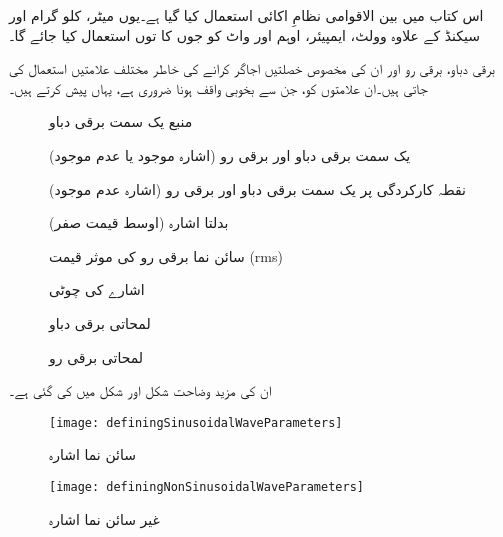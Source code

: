 
اس کتاب میں بین الاقوامی نظامِ اکائی  استعمال کیا گیا ہے۔یوں میٹر، کلو گرام اور سیکنڈ کے علاوہ وولٹ، ایمپیئر، اوہم اور واٹ کو جوں کا توں استعمال کیا جائے گا۔

برقی دباو، برقی رو اور ان کی مخصوص خصلتیں اجاگر کرانے کی خاطر مختلف علامتیں استعمال کی جاتی ہیں۔ان علامتوں کو، جن سے بخوبی واقف ہونا ضروری ہے، یہاں پیش کرتے ہیں۔

\begin{description}
\item
[]  منبع یک سمت برقی دباو
\item
[] یک سمت برقی دباو اور برقی رو  (اشارہ موجود یا عدم موجود)
\item
[]  نقطہ کارکردگی پر یک سمت برقی دباو اور برقی رو (اشارہ عدم موجود)
\item
[] بدلتا اشارہ (اوسط قیمت صفر)
\item
[ ]  سائن نما برقی رو کی موثر قیمت (rms)
\item
[ ]  اشارے کی چوٹی
\item
[ ] لمحاتی برقی دباو
\item
[ ] لمحاتی برقی رو
\end{description}

\FloatBarrier

ان کی مزید وضاحت شکل   اور شکل  میں کی گئی ہے۔

\begin{figure}
\centering
\texttt{[image: definingSinusoidalWaveParameters]}
\caption{سائن نما اشارہ}
\label{شکل_سائن_نما_اشارے_کے_جزو}
\end{figure}

\begin{figure}
\centering
\texttt{[image: definingNonSinusoidalWaveParameters]}
\caption{غیر سائن نما اشارہ}
\label{شکل_غیر_سائن_نما_اشارے_کے_جزو}
\end{figure}

\FloatBarrier



